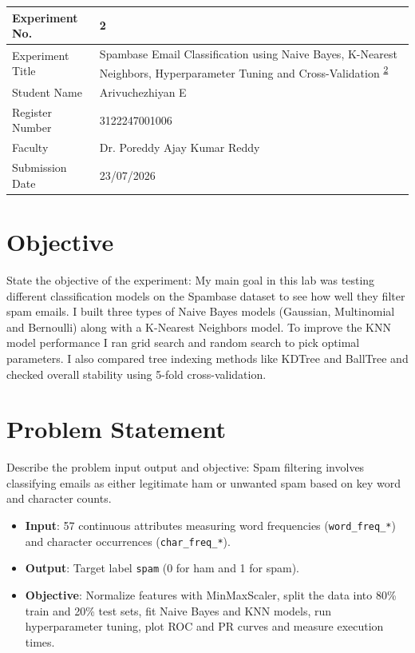 \documentclass[12pt,a4paper]{article}
\begin{document}

\begin{tabular}{|p{4cm}|p{11cm}|}
\hline
Experiment No. & 2 \\ \hline
Experiment Title & Spambase Email Classification using Naive Bayes, K-Nearest Neighbors, Hyperparameter Tuning and Cross-Validation \textsuperscript{\href{https://github.com/arivuchezhiyan/Machine_Learning/tree/main/experiment_2}{2}} \\ \hline
Student Name & Arivuchezhiyan E \\ \hline
Register Number & 3122247001006 \\ \hline
Faculty & Dr. Poreddy Ajay Kumar Reddy \\ \hline
Submission Date & 23/07/2026 \\ \hline
\end{tabular}

\section{Objective}
State the objective of the experiment:
My main goal in this lab was testing different classification models on the Spambase dataset to see how well they filter spam emails. I built three types of Naive Bayes models (Gaussian, Multinomial and Bernoulli) along with a K-Nearest Neighbors model. To improve the KNN model performance I ran grid search and random search to pick optimal parameters. I also compared tree indexing methods like KDTree and BallTree and checked overall stability using 5-fold cross-validation.

\section{Problem Statement}
Describe the problem input output and objective:
Spam filtering involves classifying emails as either legitimate ham or unwanted spam based on key word and character counts.
\begin{itemize}
\item \textbf{Input}: 57 continuous attributes measuring word frequencies (\texttt{word\_freq\_*}) and character occurrences (\texttt{char\_freq\_*}).
\item \textbf{Output}: Target label \texttt{spam} (0 for ham and 1 for spam).
\item \textbf{Objective}: Normalize features with MinMaxScaler, split the data into 80\% train and 20\% test sets, fit Naive Bayes and KNN models, run hyperparameter tuning, plot ROC and PR curves and measure execution times.
\end{itemize}
\end{document}
